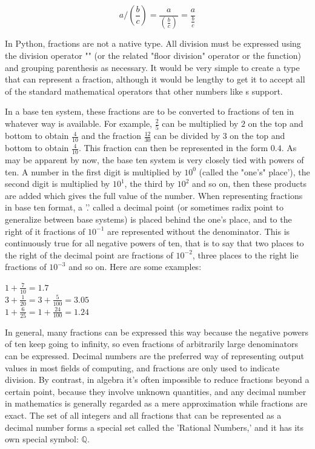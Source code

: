 \begin{equation}\label{eq:fraction-nesting}
a / \left(\frac{b}{c}\right) =\frac{a}{\left(\frac{b}{c}\right)} = \frac{a}{\frac{b}{c}}
\end{equation}

In Python, fractions are not a native type. All division must be expressed using the division operator "\code{/}" (or the related "floor division" operator \code{//} or the  function) and grouping parenthesis as necessary. It would be very simple to create a type that can represent a fraction, although it would be lengthy to get it to accept all of the standard mathematical operators that other numbers like s support.

In a base ten system, these fractions are to be converted to fractions of ten in whatever way is available. For example, $\frac{2}{5}$ can be multiplied by $2$ on the top and bottom to obtain $\frac{4}{10}$ and the fraction $\frac{12}{30}$ can be divided by $3$ on the top and bottom to obtain $\frac{4}{10}$. This fraction can then be represented in the form $0.4$. As may be apparent by now, the base ten system is very closely tied with powers of ten. A number in the first digit is multiplied by $10^0$ (called the "one's" place'), the second digit is multiplied by $10^1$, the third by $10^2$ and so on, then these products are added which gives the full value of the number. When representing fractions in base ten format, a '.' called a decimal point (or sometimes radix point to generalize between base systems) is placed behind the one's place, and to the right of it fractions of $10^{-1}$ are represented without the denominator. This is continuously true for all negative powers of ten, that is to say that two places to the right of the decimal point are fractions of $10^{-2}$, three places to the right lie fractions of $10^{-3}$ and so on. Here are some examples:
\begin{center}
$1+\frac{7}{10}=1.7$ \\
$3+\frac{1}{20}=3+\frac{5}{100}=3.05$ \\
$1+\frac{6}{25}=1+\frac{24}{100}=1.24$ \\
\end{center}
In general, many fractions can be expressed this way because the negative powers of ten keep going to infinity, so even fractions of arbitrarily large denominators can be expressed. Decimal numbers are the preferred way of representing output values in most fields of computing, and fractions are only used to indicate division. By contrast, in algebra it's often impossible to reduce fractions beyond a certain point, because they involve unknown quantities, and any decimal number in mathematics is generally regarded as a mere approximation while fractions are exact. The set of all integers and all fractions that can be represented as a decimal number forms a special set called the 'Rational Numbers,' and it has its own special symbol: $\mathbb{Q}$.

